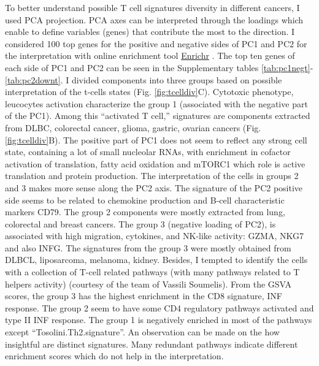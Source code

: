 \documentclass[12pt,]{book}
\theoremstyle{definition}
\theoremstyle{definition}
\theoremstyle{definition}
\theoremstyle{remark}
\begin{document}
To better understand possible T cell signatures diversity in different
cancers, I used PCA projection. PCA axes can be interpreted through the
loadings which enable to define variables (genes) that contribute the
most to the direction. I considered 100 top genes for the positive and
negative sides of PC1 and PC2 for the interpretation with online
enrichment tool \href{http://amp.pharm.mssm.edu/Enrichr/}{Enrichr}
\citep{Chen2013}. The top ten genes of each side of PC1 and PC2 can be
seen in the Supplementary tables \ref{tab:pc1negt}-\ref{tab:pc2downt}. I
divided components into three groups based on possible interpretation of
the t-cells states (Fig. \ref{fig:tcelldiv}C). Cytotoxic phenotype,
leucocytes activation characterize the group 1 (associated with the
negative part of the PC1). Among this ``activated T cell,'' signatures
are components extracted from DLBC, colorectal cancer, glioma, gastric,
ovarian cancers (Fig. \ref{fig:tcelldiv}B). The positive part of PC1
does not seem to reflect any strong cell state, containing a lot of
small nucleolar RNAs, with enrichment in cofactor activation of
translation, fatty acid oxidation and mTORC1 which role is active
translation and protein production. The interpretation of the cells in
groups 2 and 3 makes more sense along the PC2 axis. The signature of the
PC2 positive side seems to be related to chemokine production and B-cell
characteristic markers CD79. The group 2 components were mostly
extracted from lung, colorectal and breast cancers. The group 3
(negative loading of PC2), is associated with high migration, cytokines,
and NK-like activity: GZMA, NKG7 and also INFG. The signatures from the
group 3 were mostly obtained from DLBCL, liposarcoma, melanoma, kidney.
Besides, I tempted to identify the cells with a collection of T-cell
related pathways (with many pathways related to T helpers activity)
(courtesy of the team of Vassili Soumelis). From the GSVA
\citep{Hanzelmann2013} scores, the group 3 has the highest enrichment in
the CD8 signature, INF response. The group 2 seem to have some CD4
regulatory pathways activated and type II INF response. The group 1 is
negatively enriched in most of the pathways except
``Tosolini.Th2.signature''. An observation can be made on the how
insightful are distinct signatures. Many redundant pathways indicate
different enrichment scores which do not help in the interpretation.
\end{document}
